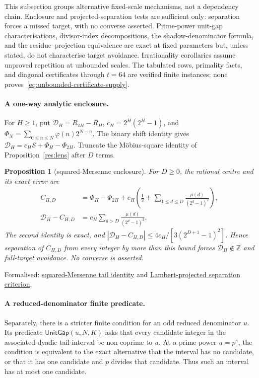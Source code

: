 \documentclass[11pt]{article}
\newcommand{\commit}{ebc98ee71f6819bd9fe344a0bb343542c604e533}
\newcommand{\repobase}{https://github.com/wcook04/plectis-lean-erdos249-257/blob/\commit}
\newcommand{\PK}{Erdos249257}
\newcommand{\lword}[4]{\href{\repobase/\PK/#1\#L#2}{#4}}
\newtheorem{proposition}[theorem]{Proposition}
\theoremstyle{definition}
\theoremstyle{remark}
\newcommand{\Z}{\mathbb{Z}}
\newcommand{\ph}{\varphi}
\begin{document}
{This subsection groups alternative fixed-scale mechanisms, not a dependency
chain.  Enclosure and projected-separation tests are sufficient only:
separation forces a missed target, with no converse asserted.  Prime-power
unit-gap characterisations, divisor-index decompositions, the shadow-denominator
formula, and the residue--projection equivalence are exact at fixed parameters
but, unless stated, do not characterise target avoidance.  Irrationality
corollaries assume unproved repetition at unbounded scales.  The tabulated
rows, primality facts, and diagonal certificates through $t=64$ are verified
finite instances; none proves~\eqref{eq:unbounded-certificate-supply}.

\paragraph{A one-way analytic enclosure.}
For $H\ge1$, put $\mathcal D_H=R_{2H}-R_H$,
$c_H=2^H(2^H-1)$, and
$\Phi_N=\sum_{0\le n\le N}\ph(n)2^{N-n}$.  The binary shift identity gives
$\mathcal D_H=c_HS+\Phi_H-\Phi_{2H}$.  Truncate the M\"obius-square identity
of Proposition~\ref{res:lens} after $D$ terms.

\begin{proposition}[squared-Mersenne enclosure]\label{res:squareenclosure}
For $D\ge0$, the rational centre and its exact error are
\[
 \begin{aligned}
 C_{H,D}&=\Phi_H-\Phi_{2H}
   +c_H\left(\frac12+\sum_{1\le d\le D}
      \frac{\mu(d)}{(2^d-1)^2}\right),\\
 \mathcal D_H-C_{H,D}
   &=c_H\sum_{d>D}\frac{\mu(d)}{(2^d-1)^2}.
 \end{aligned}
\]
The second identity is exact, and
$|\mathcal D_H-C_{H,D}|\le4c_H/[3(2^{D+1}-1)^2]$.  Hence separation of
$C_{H,D}$ from every integer by more than this bound forces
$\mathcal D_H\notin\Z$ and full-target avoidance.  No converse is asserted.
\end{proposition}
\noindent Formalised:
\lword{SquaredMersenneDiagonalEnclosure.lean}{116}{scaleDiagonalTailDifference_sub_lambertProjectedDiagonal}{squared-Mersenne tail identity}
and
\lword{SquaredMersenneDiagonalEnclosure.lean}{237}{scaleFullTarget_miss_of_lambert_projected_separation}{Lambert-projected separation criterion}.

\paragraph{A reduced-denominator finite predicate.}  Separately, there is a
stricter finite condition for an odd reduced denominator
$u$.  Its predicate $\mathsf{UnitGap}(u,N,K)$ asks that
every candidate integer in the associated dyadic tail interval be non-coprime
to $u$.  At a prime power $u=p^e$, the condition is equivalent to the exact
alternative that the interval has no candidate, or that it has one candidate
and $p$ divides that candidate.  Thus such an interval has at most one
candidate.

}
\end{document}

